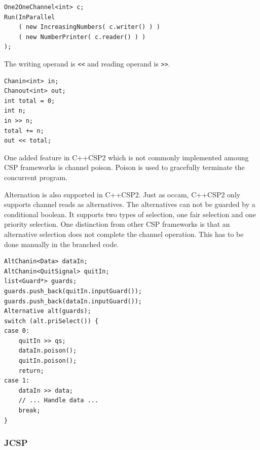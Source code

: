 \noindent\begin{minipage}{\textwidth}
\begin{lstlisting}[style={CustomC++},frame={},numbers={none},xleftmargin={4em}]
One2OneChannel<int> c;
Run(InParallel
    ( new IncreasingNumbers( c.writer() ) )
    ( new NumberPrinter( c.reader() ) )
);
\end{lstlisting}
\end{minipage}

The writing operand is \texttt{<{}<} and reading operand is \texttt{>{}>}. 

\noindent\begin{minipage}{\textwidth}
\begin{lstlisting}[style={CustomC++},frame={},numbers={none},xleftmargin={4em}]
Chanin<int> in;
Chanout<int> out;
int total = 0;          
int n;
in >> n;
total += n;
out << total;
\end{lstlisting}
\end{minipage}

One added feature in C++CSP2 which is not commonly implemented amoung CSP frameworks is channel poison. Poison is used to gracefully terminate the concurrent program. 

Alternation is also supported in C++CSP2. Just as occam, C++CSP2 only supports channel reads as alternatives. The alternatives can not be guarded by a conditional boolean. It supports two types of selection, one fair selection and one priority selection. One distinction from other CSP frameworks is that an alternative selection does not complete the channel operation. This has to be done manually in the branched code. 

\noindent\begin{minipage}{\textwidth}
\begin{lstlisting}[style={CustomC++},frame={},numbers={none},xleftmargin={4em}]
AltChanin<Data> dataIn;
AltChanin<QuitSignal> quitIn;
list<Guard*> guards;
guards.push_back(quitIn.inputGuard());
guards.push_back(dataIn.inputGuard());
Alternative alt(guards);
switch (alt.priSelect()) {
case 0:                                                 
    quitIn >> qs;
    dataIn.poison();
    quitIn.poison();
    return;
case 1:
    dataIn >> data;
    // ... Handle data ...
    break;                          
}
\end{lstlisting}
\end{minipage}


\subsubsection{JCSP}
\label{sssec:jcsp}

